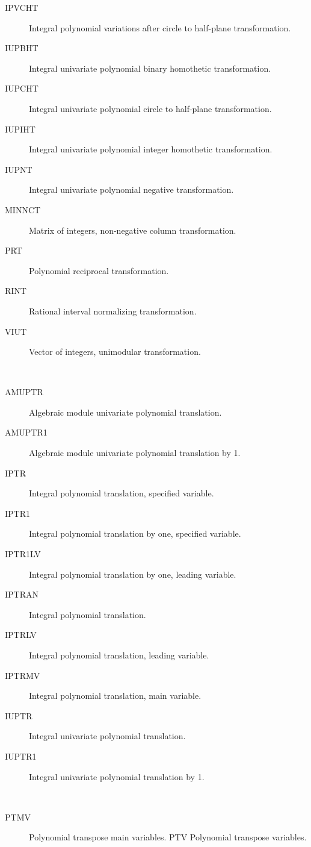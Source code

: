 \begin{description}
\begin{description}
  \item[IPVCHT]  Integral polynomial variations after circle to half-plane
    transformation.
  \item[IUPBHT]  Integral univariate polynomial binary homothetic
    transformation.
  \item[IUPCHT]  Integral univariate polynomial circle to half-plane
    transformation.
  \item[IUPIHT]  Integral univariate polynomial integer homothetic
    transformation.
  \item[IUPNT]  Integral univariate polynomial negative transformation.
  \item[MINNCT]  Matrix of integers, non-negative column transformation.
  \item[PRT]  Polynomial reciprocal transformation.
  \item[RINT]  Rational interval normalizing transformation.
  \item[VIUT]  Vector of integers, unimodular transformation.
  \end{description}
\item[translation] \ \ 
  \begin{description}
  \item[AMUPTR]  Algebraic module univariate polynomial translation.
  \item[AMUPTR1]  Algebraic module univariate polynomial translation by 1.
  \item[IPTR]  Integral polynomial translation, specified variable.
  \item[IPTR1]  Integral polynomial translation by one, specified variable.
  \item[IPTR1LV]  Integral polynomial translation by one, leading variable.
  \item[IPTRAN]  Integral polynomial translation.
  \item[IPTRLV]  Integral polynomial translation, leading variable.
  \item[IPTRMV]  Integral polynomial translation, main variable.
  \item[IUPTR]  Integral univariate polynomial translation.
  \item[IUPTR1]  Integral univariate polynomial translation by 1.
  \end{description}
\item[transpose] \ \ 
  \begin{description}
  \item[PTMV]  Polynomial transpose main variables. PTV Polynomial transpose
    variables.

\end{description}
\end{description}
